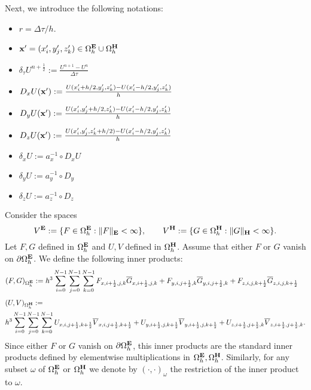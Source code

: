 \documentclass[12pt,reqno]{amsart}
\newcommand{\e}{{\bf E}}
\newcommand{\h}{{\bf H}}
\theoremstyle{definition}
\numberwithin{equation}{section}
\def\Gwh{\Omega_h}
\begin{document}
   
   Next, we introduce the following notations:
	\begin{itemize}
		\item $r=\Delta \tau/h$.\\[1mm]
		\item ${\bf x'}=(x_i',y_j',z_k')\in \Gwh^\e\cup\Gwh^\h$\\[1mm]
		\item $\delta_{\tau} U^{n+\frac{1}{2}}:=\frac{U^{n+1}-U^{n}}{\Delta \tau}$\\[1mm]
				\item $D_x U({\bf x'}):=\frac{U(x_i'+h/2,y_j',z_k')-U(x_i'-h/2,y_j',z_k')}{h}$\\[1mm]
	\item $D_y U({\bf x'}):=\frac{U(x_i',y_j'+h/2,z_k')-U(x_i'-h/2,y_j',z_k')}{h}$\\[1mm]
		\item $D_z U({\bf x'}):=\frac{U(x_i',y_j',z_k'+h/2)-U(x_i'-h/2,y_j',z_k')}{h}$\\[1mm]
		\item $\delta_x U:=a_x^{-1}\circ D_xU$\\[1mm]
		\item $\delta_y U:=a_y^{-1}\circ D_y$\\[1mm]
		\item 	$\delta_z U:=a_z^{-1}\circ D_z$\\[1mm]
	\end{itemize}
		Consider  the spaces 
		$$
		V^{\bf{E}}:=\{F \in \Gwh^{\bf{E}}:\|F\|_{\bf{E}}<\infty\}, \qquad 
		V^{\bf{H}}:=\{G \in \Gwh^{\bf{H}}:\|G\|_{\bf{H}}<\infty\}.
		$$
		Let $F,G$ defined in $\Gwh^{\bf{E}}$ and $U,V$ defined in 
		$\Gwh^{\bf{H}}$. Assume that either $F$ or $G$ vanish on $\partial \Gwh^\e$.
		We define the following inner products:
		\begin{align*}
&
		(F,G)_{\Gwh^\e}:=
		h^3\sum_{i=0}^{N-1}\sum_{j=0}^{N-1}\sum_{k=0}^{N-1}
		F_{x,i+\frac{1}{2},j,k}\overline{G}_{x,i+\frac{1}{2},j,k}+
		F_{y,i,j+\frac{1}{2},k}\overline{G}_{y,i,j+\frac{1}{2},k}+F_{z,i,j,k+\frac{1}{2}}\overline{G}_{z,i,j,k+\frac{1}{2}}
	\end{align*}
		\begin{align*}
			&
			(U,V)_{\Gwh^\h}:=\\&
			h^3\sum_{i=0}^{N-1}\sum_{j=0}^{N-1}\sum_{k=0}^{N-1}
			U_{x,i,j+\frac{1}{2},k+\frac{1}{2}}\overline{V}_{x,i,j+\frac{1}{2},k+\frac{1}{2}}+
			U_{y,i+\frac{1}{2},j,k+\frac{1}{2}}\overline{V}_{y,i+\frac{1}{2},j,k+\frac{1}{2}}+U_{z,i+\frac{1}{2},j+\frac{1}{2},k}\overline{V}_{z,i+\frac{1}{2},j+\frac{1}{2},k}.
		\end{align*}
		Since either $F$ or $G$ vanish on $\partial \Gwh^\e$, this inner products are the standard inner products defined by elementwise  multiplications in $\Gwh^\e, \Gwh^\h$.
		Similarly, for any subset $\omega$ of $\Gwh^\e$ or $\Gwh^\h$ we denote by $(\cdot,\cdot)_{\omega}$ the restriction of the  inner product to $\omega$.
		
\end{document}
